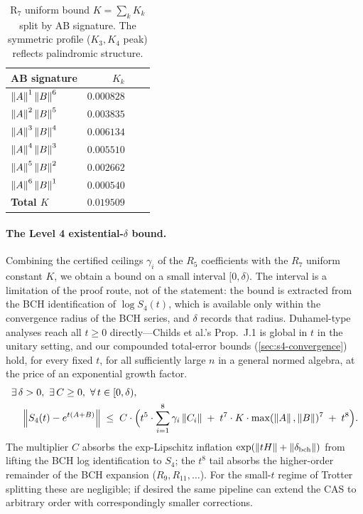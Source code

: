 \begin{table}[ht]
\centering
\begin{tabular}{@{}lrlr@{}}
\toprule
\textbf{AB signature} & $K_k$ \\
\midrule
$\left\|A\right\|^1 \left\|B\right\|^6$ & $0.000828$ \\
$\left\|A\right\|^2 \left\|B\right\|^5$ & $0.003835$ \\
$\left\|A\right\|^3 \left\|B\right\|^4$ & $0.006134$ \\
$\left\|A\right\|^4 \left\|B\right\|^3$ & $0.005510$ \\
$\left\|A\right\|^5 \left\|B\right\|^2$ & $0.002662$ \\
$\left\|A\right\|^6 \left\|B\right\|^1$ & $0.000540$ \\
\midrule
\textbf{Total $K$} & $0.019509$ \\
\bottomrule
\end{tabular}
\caption{R$_7$ uniform bound $K = \sum_k K_k$ split by AB signature. The
symmetric profile ($K_3, K_4$ peak) reflects palindromic structure.}
\label{tab:r7-breakdown}
\end{table}

\paragraph{The Level 4 existential-$\delta$ bound.}
Combining the certified ceilings $\gamma_i$ of the $R_5$ coefficients with
the $R_7$ uniform constant $K$, we obtain a bound on a small interval
$[0, \delta)$. The interval is a limitation of the proof route, not of the
statement: the bound is extracted from the BCH identification of
$\log S_4(t)$, which is available only within the convergence radius of the
BCH series, and $\delta$ records that radius. Duhamel-type analyses reach
all $t \ge 0$ directly---Childs et al.'s Prop.~J.1 is global in $t$ in the
unitary setting, and our compounded total-error bounds
(\cref{sec:s4-convergence}) hold, for every fixed $t$, for all sufficiently
large $n$ in a general normed algebra, at the price of an exponential
growth factor.
\begin{equation}\label{eq:level4}
\begin{aligned}
  &\exists\, \delta > 0,\ \exists\, C \ge 0,\ \forall\, t \in [0, \delta), \\
  &\quad \left\|S_4(t) - e^{t(A+B)}\right\|
    \;\le\;
  C \cdot \Big( t^5 \cdot \sum_{i=1}^{8} \gamma_i \left\|C_i\right\|
  \;+\;
  t^7 \cdot K \cdot \max(\left\|A\right\|, \left\|B\right\|)^7
  \;+\;
  t^8 \Big).
\end{aligned}
\end{equation}
The multiplier $C$ absorbs the exp-Lipschitz inflation
$\exp(\left\|tH\right\| + \left\|\delta_{\mathrm{bch}}\right\|)$ from lifting the BCH
log identification to $S_4$; the $t^8$ tail absorbs the higher-order
remainder of the BCH expansion ($R_9, R_{11}, \ldots$). For the small-$t$
regime of Trotter splitting these are negligible; if desired the same
pipeline can extend the CAS to arbitrary order with correspondingly
smaller corrections.

